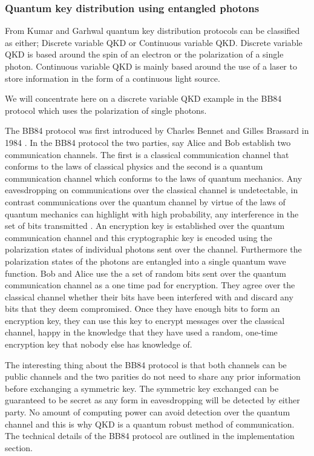 \documentclass{article}
\begin{document}
\subsubsection{Quantum key distribution using entangled photons}
From Kumar and Garhwal \cite{Kumar2021State-of-the-ArtCryptography} quantum key distribution protocols can be classified as either; Discrete variable QKD or Continuous variable QKD. Discrete variable QKD is based around the spin of an electron or the polarization of a single photon. Continuous variable QKD is mainly based around the use of a laser to store information in the form of a continuous light source.

We will concentrate here on a discrete variable QKD example in the BB84 protocol which uses the polarization of single photons.  

The BB84 protocol was first introduced by Charles Bennet and Gilles Brassard in 1984 \cite{Bennett2020QuantumTossing} . In the BB84 protocol the two parties, say Alice and Bob establish two communication channels. The first is a classical communication channel that conforms to the laws of classical physics and the second is a quantum communication channel which conforms to the laws of quantum mechanics. Any eavesdropping on communications over the classical channel is undetectable, in contrast communications over the quantum channel by virtue of the laws of quantum mechanics can highlight with high probability, any interference in the set of bits transmitted . An encryption key is established over the quantum communication channel and this cryptographic key is encoded using the polarization states of individual photons sent over the channel. Furthermore the polarization states of the photons are entangled into a single quantum wave function. Bob and Alice use the a set of random bits sent over the quantum communication channel as a one time pad for encryption. They agree over the classical channel whether their bits have been interfered with and discard any bits that they deem compromised. Once they have enough bits to form an encryption key, they can use this key to encrypt messages over the classical channel, happy in the knowledge that they have used a random, one-time encryption key that nobody else has knowledge of.

The interesting thing about the BB84 protocol is that both channels can be public channels and the two parities do not need to share any prior information before exchanging a symmetric key. The symmetric key exchanged can be guaranteed to be  secret as any form in eavesdropping will be detected by either party. No amount of computing power can avoid detection over the quantum channel and this is why QKD is a quantum robust method of communication. The technical details of the BB84 protocol are outlined in the implementation section.
\end{document}
